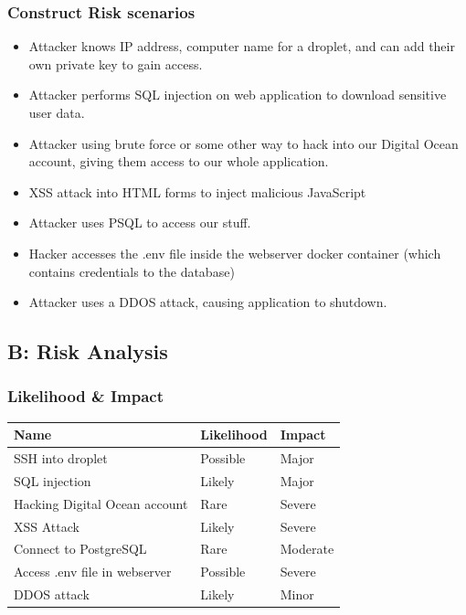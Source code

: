 \subsubsection*{Construct Risk scenarios}
\begin{itemize}
    \item Attacker knows IP address, computer name for a droplet, and can add their own private key to gain access.
    \item Attacker performs SQL injection on web application to download sensitive user data.
    \item Attacker using brute force or some other way to hack into our Digital Ocean account, giving them access to our whole application.
    \item XSS attack into HTML forms to inject malicious JavaScript
    \item Attacker uses PSQL to access our stuff.
    \item Hacker accesses the .env file inside the webserver docker container (which contains credentials to the database)
    \item Attacker uses a DDOS attack, causing application to shutdown.
\end{itemize}

\subsection*{B: Risk Analysis}
\subsubsection*{Likelihood \& Impact}

\begin{table}[h!]
\begin{tabular}{| l | l | l |}
 \hline
 Name & Likelihood & Impact \\ \hline
 SSH into droplet & Possible &  Major \\ \hline
 SQL injection & Likely &  Major \\ \hline
 Hacking Digital Ocean account & Rare & Severe \\ \hline
 XSS Attack & Likely & Severe \\ \hline
 Connect to PostgreSQL & Rare & Moderate \\ \hline
 Access .env file in webserver & Possible & Severe \\ \hline
 DDOS attack & Likely & Minor \\ \hline
\end{tabular}
\end{table}

